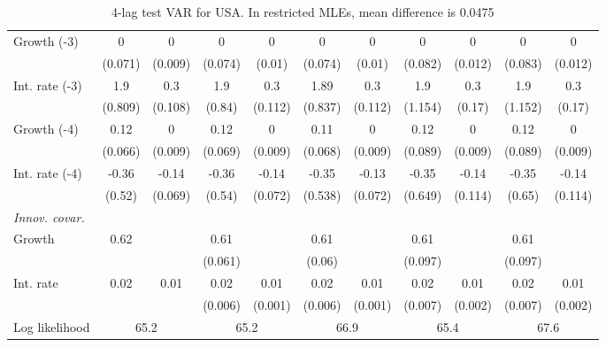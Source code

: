 \begin{table}[htbp]
\begin{tabular}{@{\extracolsep{4pt}}lcccccccccc@{}}
\quad Growth (-3) 	 &0 	 & 0 	 & 0 	 & 0 	 & 0 	 & 0 	 & 0 	 & 0 	 & 0 	 & 0	 \\ 
 		 & (0.071) 	 & (0.009) 	 & (0.074) 	 & (0.01) 	 & (0.074) 	 & (0.01) 	 & (0.082) 	 & (0.012) 	 & (0.083) 	 & (0.012) 	 \\ 
\quad Int. rate (-3) 	 &1.9 	 & 0.3 	 & 1.9 	 & 0.3 	 & 1.89 	 & 0.3 	 & 1.9 	 & 0.3 	 & 1.9 	 & 0.3	 \\ 
 		 & (0.809) 	 & (0.108) 	 & (0.84) 	 & (0.112) 	 & (0.837) 	 & (0.112) 	 & (1.154) 	 & (0.17) 	 & (1.152) 	 & (0.17) 	 \\ 
\quad Growth (-4) 	 &0.12 	 & 0 	 & 0.12 	 & 0 	 & 0.11 	 & 0 	 & 0.12 	 & 0 	 & 0.12 	 & 0	 \\ 
 		 & (0.066) 	 & (0.009) 	 & (0.069) 	 & (0.009) 	 & (0.068) 	 & (0.009) 	 & (0.089) 	 & (0.009) 	 & (0.089) 	 & (0.009) 	 \\ 
\quad Int. rate (-4) 	 &-0.36 	 & -0.14 	 & -0.36 	 & -0.14 	 & -0.35 	 & -0.13 	 & -0.35 	 & -0.14 	 & -0.35 	 & -0.14	 \\ 
 		 & (0.52) 	 & (0.069) 	 & (0.54) 	 & (0.072) 	 & (0.538) 	 & (0.072) 	 & (0.649) 	 & (0.114) 	 & (0.65) 	 & (0.114) 	 \\ 
\rule{0pt}{4ex} \emph{Innov. covar.}  	 & 	 & 	 & 	 & 	 & 	 & 	 & 	 & 	 & 	 &\\ 
\quad Growth 	 &0.62 	 &  	 & 0.61 	 &  	 & 0.61 	 &  	 & 0.61 	 &  	 & 0.61 	 & 	 \\ 
 		 &  	 &  	 & (0.061) 	 &  	 & (0.06) 	 &  	 & (0.097) 	 &  	 & (0.097) 	 &  	 \\ 
\quad Int. rate 	 &0.02 	 & 0.01 	 & 0.02 	 & 0.01 	 & 0.02 	 & 0.01 	 & 0.02 	 & 0.01 	 & 0.02 	 & 0.01	 \\ 
 		 &  	 &  	 & (0.006) 	 & (0.001) 	 & (0.006) 	 & (0.001) 	 & (0.007) 	 & (0.002) 	 & (0.007) 	 & (0.002) 	 \\ 
 \hline \rule{0pt}{4ex} 
  Log likelihood 	 &\multicolumn{2}{c}{65.2} 	 & \multicolumn{2}{c}{65.2} 	 & \multicolumn{2}{c}{66.9} 	 & \multicolumn{2}{c}{65.4} 	 & \multicolumn{2}{c}{67.6}\\ 

 \hline 	\end{tabular}		\caption{4-lag test VAR for USA. In restricted MLEs, mean difference is 0.0475}
		\label{tab:USA4lag}

\end{table}